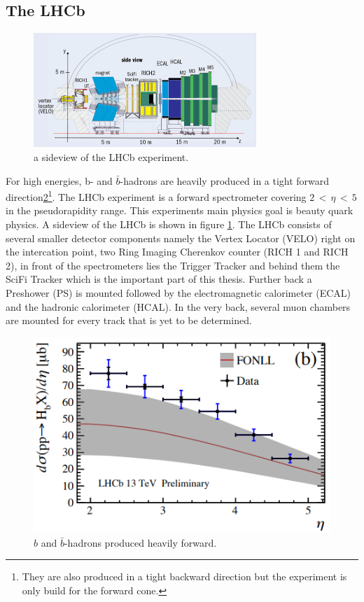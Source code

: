 \subsection{The LHCb}

\begin{figure}
  \centering
  \includegraphics[width=0.75\textwidth]{plots/LHCb_facility.jpg}
  \caption{a sideview of the LHCb experiment.}
  \label{fig:LHCb}
\end{figure}

For high energies, b- and $\bar{b}$-hadrons are heavily produced in a tight forward
direction\ref{fig:bbforward}\footnote{They are also produced in a tight backward
direction but the experiment is only build for the forward cone.}.
The LHCb experiment\cite{lhcbInfo} is a forward spectrometer covering
$2 \,<\, \eta \,<\, 5$ in the pseudorapidity range. This experiments main
physics goal is beauty quark physics. A sideview of
the LHCb is shown in figure \ref{fig:LHCb}.
The LHCb consists of several smaller detector components namely the Vertex Locator
(VELO) right on the intercation point, two Ring Imaging Cherenkov counter
(RICH 1 and RICH 2), in front of the spectrometers lies the Trigger Tracker and
behind them the SciFi Tracker which is the important part of this thesis. Further
back a Preshower (PS) is mounted followed
by the electromagnetic calorimeter (ECAL) and the hadronic calorimeter (HCAL).
In the very back, several muon chambers are mounted for every track that is yet
to be determined.


\begin{figure}
  \centering
  \includegraphics{plots/bbar_forward.png}
  \caption{$b$ and $\bar{b}$-hadrons produced heavily forward.}
  \label{fig:bbforward}
\end{figure}

